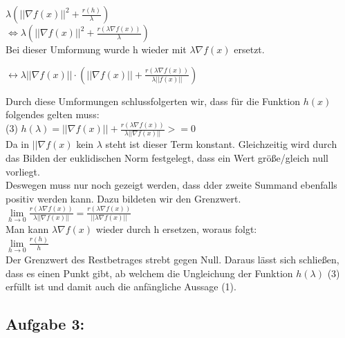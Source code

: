 \documentclass{article}
\begin{document}
\begin{multicols}{2}
$\lambda (||\nabla f(x)||^2 + \frac{r(h)}{\lambda})$ \\

$\Leftrightarrow \lambda(||\nabla f(x)||^2 + \frac{r(\lambda \nabla f(x))}{\lambda})$ \\

Bei dieser Umformung wurde h wieder mit $\lambda\nabla f(x)$ ersetzt.

$\leftrightarrow \lambda ||\nabla f(x)|| \cdot (||\nabla f(x)|| + \frac{r(\lambda \nabla f(x))}{\lambda || f(x)||})$


Durch diese Umformungen schlussfolgerten wir, dass f\"ur die Funktion $h(x)$ folgendes gelten muss:\\
(3) $h(\lambda)=||\nabla f(x)|| + \frac{r(\lambda\nabla f(x))}{\lambda||\nabla f(x)||} >=0$ \\

Da in $||\nabla f(x)$ kein $\lambda$ steht ist dieser Term konstant. Gleichzeitig wird durch das Bilden der euklidischen Norm festgelegt, dass ein Wert größe/gleich null vorliegt. \\ %
Deswegen muss nur noch gezeigt werden, dass dder zweite Summand ebenfalls positiv werden kann. Dazu bildeten wir den Grenzwert. \\ %
$\lim\limits_{h \rightarrow 0}{\frac{r(\lambda \nabla f(x))}{\lambda ||\nabla f(x)||}} = \frac{r(\lambda \nabla f(x))}{||\lambda  \nabla f(x)||}$ \\ %

Man kann $\lambda \nabla f(x)$ wieder durch h ersetzen, woraus folgt: \\
$\lim\limits_{h \rightarrow 0} \frac{r(h)}{h}$ \\

Der Grenzwert des Restbetrages strebt gegen Null. Daraus lässt sich schließen, dass es einen Punkt gibt, ab welchem die Ungleichung der Funktion $h(\lambda)$ (3) erfüllt ist und damit auch die anfängliche Aussage (1). \\ %
\vspace{15pt}

\subsection{Aufgabe 3:} 


\end{multicols}
\end{document}
